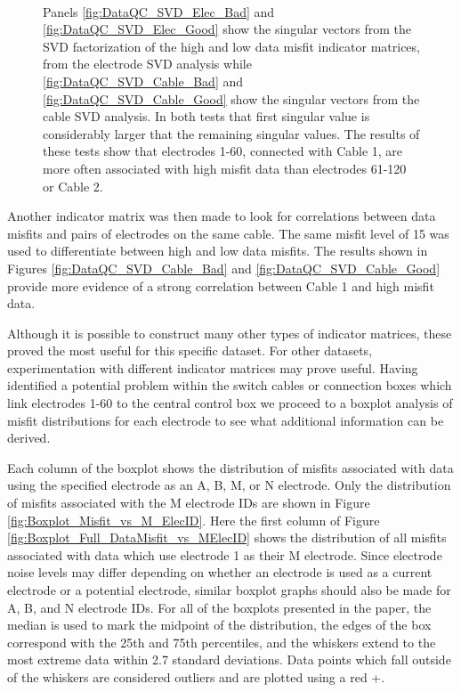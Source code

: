 \documentclass[final,authoryear,5p,times,twocolumn]{elsarticle}
\begin{document}
\begin{figure} [!ht]
\begin{center}
{       } \\%
    \end{center}
\caption{Panels \ref{fig:DataQC_SVD_Elec_Bad} and \ref{fig:DataQC_SVD_Elec_Good} show the singular vectors from the SVD factorization of the high and low data misfit indicator matrices, from the electrode SVD analysis while \ref{fig:DataQC_SVD_Cable_Bad} and \ref{fig:DataQC_SVD_Cable_Good} show the singular vectors from the cable SVD analysis. In both tests that first singular value is considerably larger that the remaining singular values. The results of these tests show that electrodes 1-60, connected with Cable 1, are more often associated with high misfit data than electrodes 61-120 or Cable 2.}
\label{fig:DataQC_SVD_ElecCable}
\end{figure}

Another indicator matrix was then made to look for correlations between data misfits and pairs of electrodes on the same cable. The same misfit level of 15 was used to differentiate between high and low data misfits. The results shown in Figures \ref{fig:DataQC_SVD_Cable_Bad} and \ref{fig:DataQC_SVD_Cable_Good} provide more evidence of a strong correlation between Cable 1 and high misfit data.

Although it is possible to construct many other types of indicator matrices, these proved the most useful for this specific dataset. For other datasets, experimentation with different indicator matrices may prove useful. Having identified a potential problem within the switch cables or connection boxes which link electrodes 1-60 to the central control box we proceed to a boxplot analysis of misfit distributions for each electrode to see what additional information can be derived.

Each column of the boxplot shows the distribution of misfits associated with data using the specified electrode as an A, B, M, or N electrode. Only the distribution of misfits associated with the M electrode IDs are shown in Figure \ref{fig:Boxplot_Misfit_vs_M_ElecID}. Here the first column of Figure \ref{fig:Boxplot_Full_DataMisfit_vs_MElecID} shows the distribution of all misfits associated with data which use electrode 1 as their M electrode. Since electrode noise levels may differ depending on whether an electrode is used as a current electrode or a potential electrode, similar boxplot graphs should also be made for A, B, and N electrode IDs. For all of the boxplots presented in the paper, the median is used to mark the midpoint of the distribution, the edges of the box correspond with the 25th and 75th percentiles, and the whiskers extend to the most extreme data within 2.7 standard deviations. Data points which fall outside of the whiskers are considered outliers and are plotted using a red +.
\end{document}
